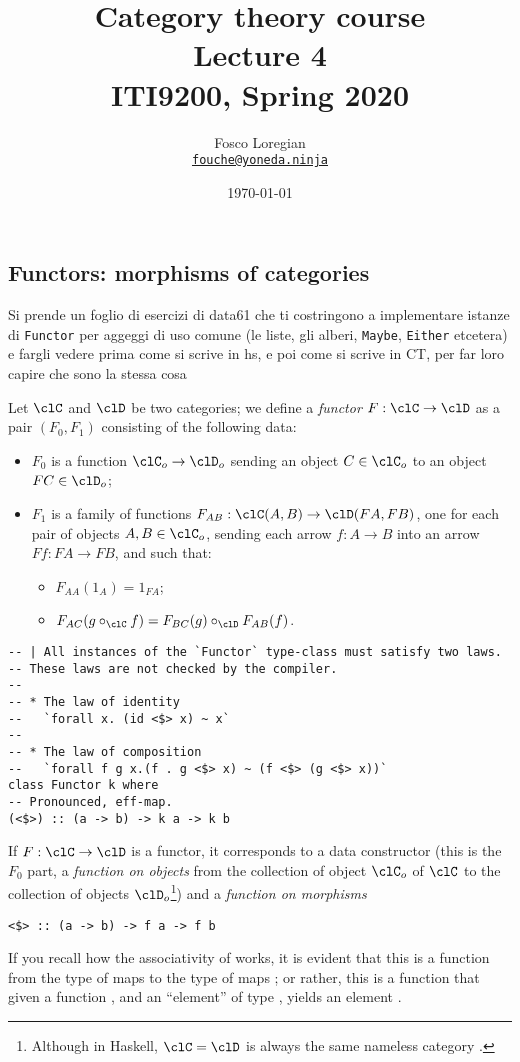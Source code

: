 \documentclass[11pt]{article}
\author{ Fosco Loregian \\
  \href{mailto:fouche@yoneda.ninja}
       {\tt fouche@yoneda.ninja}}
\date{\today}
\title{  Category theory course 
			\\ Lecture 4
			\\ ITI9200, Spring 2020
			}
\begin{document}
\maketitle
\tableofcontents

\subsection{Functors: morphisms of categories}

Si prende un foglio di esercizi di data61 che ti costringono a implementare istanze di \verb|Functor| per aggeggi
di uso comune (le liste, gli alberi,  \verb|Maybe|, \verb|Either| etcetera) e fargli vedere prima come si scrive in hs, e poi come
si scrive in CT, per far loro capire che sono la stessa cosa
\begin{definition}[Functor]
	Let $\clC$ and $\clD$ be two categories; we define a \emph{functor} $F :\clC\to \clD$ as a pair $(F_0, F_1)$ consisting of the following data:
	\begin{itemize}
		\item  $F_0$ is a function $ \clC_o\to  \clD_o$ sending an object $C\in \clC_o$ to an object $FC \in \clD_o$;
		\item  $F_1$ is a family of functions $F_{AB} : \clC(A,B)\to \clD(FA,FB)$, one for each pair of objects $A,B\in\clC_o$, sending each arrow $f:A\to B$ into an arrow $Ff:FA\to FB$, and such that:
		\begin{itemize}
			\item $F_{AA} (1_A)=1_{F A}$;
			\item $F_{AC} (g\circ_\clC f)=F_{BC} (g)\circ_\clD F_{AB} (f)$.
		\end{itemize}
	\end{itemize}
\end{definition}
\begin{verbatim}
-- | All instances of the `Functor` type-class must satisfy two laws.
-- These laws are not checked by the compiler.
--
-- * The law of identity
--   `forall x. (id <$> x) ~ x`
--
-- * The law of composition
--   `forall f g x.(f . g <$> x) ~ (f <$> (g <$> x))`
class Functor k where
-- Pronounced, eff-map.
(<$>) :: (a -> b) -> k a -> k b
\end{verbatim}
If $F : \clC \to \clD$ is a functor, it corresponds to a data constructor  (this is  the $F_0$ part, a \emph{function on objects} from the collection of object $\clC_o$ of $\clC$ to the collection of objects $\clD_o$\footnote{Although in Haskell, $\clC=\clD$ is always the same nameless category \mil{*}.}) and a \emph{function on morphisms}
\begin{verbatim}
<$> :: (a -> b) -> f a -> f b
\end{verbatim}
If you recall how the associativity of \mil{->} works, it is evident that this is a function from the type of maps  to the type of maps ; or rather, this is a function that given a function , and an ``element'' of type , yields an element .
\end{document}
